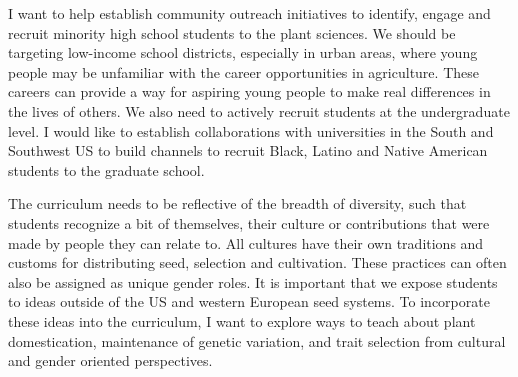 \documentclass[11pt]{article}
\begin{document}






I want to help establish community outreach initiatives to identify, engage and recruit minority high school students to the plant sciences. We should be targeting low-income school districts, especially in urban areas, where young people may be unfamiliar with the career opportunities in agriculture. These careers can provide a way for aspiring young people to make real differences in the lives of others. We also need to actively recruit students at the undergraduate level. I would like to establish collaborations with universities in the South and Southwest US to build channels to recruit Black, Latino and Native American students to the graduate school. 

The curriculum needs to be reflective of the breadth of diversity, such that students recognize a bit of themselves, their culture or contributions that were made by people they can relate to. All cultures have their own traditions and customs for distributing seed, selection and cultivation. These practices can often also be assigned as unique gender roles. It is important that we expose students to ideas outside of the US and western European seed systems. To incorporate these ideas into the curriculum, I want to explore ways to teach about plant domestication, maintenance of genetic variation, and trait selection from cultural and gender oriented perspectives. %

\end{document}
